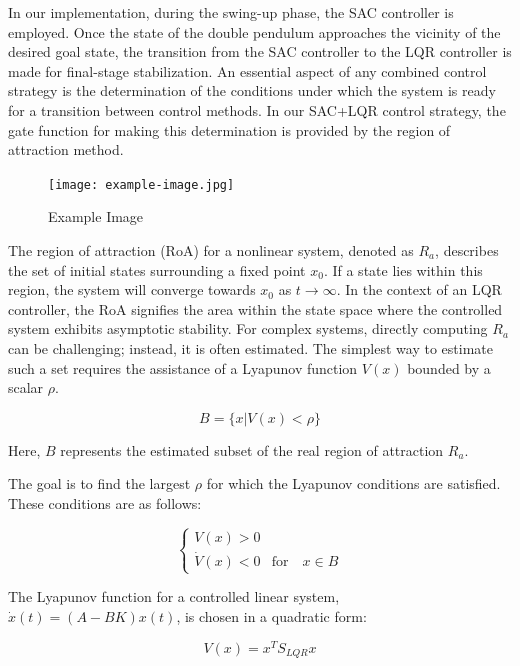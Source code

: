 In our implementation, during the swing-up phase, the SAC controller is employed. Once the state of the double pendulum approaches the vicinity of the desired goal state, the transition from the SAC controller to the LQR controller is made for final-stage stabilization. An essential aspect of any combined control strategy is the determination of the conditions under which the system is ready for a transition between control methods. In our SAC+LQR control strategy, the gate function for making this determination is provided by the region of attraction method\cite{maywald2022co}.

\begin{figure}[ht]
    \centering
    \texttt{[image: example-image.jpg]}
    \caption{Example Image}
    \label{fig:example}
\end{figure}


The region of attraction (RoA) for a nonlinear system, denoted as \(R_a\), describes the set of initial states surrounding a fixed point \(x_0\). If a state lies within this region, the system will converge towards \(x_0\) as \(t \rightarrow \infty\). In the context of an LQR controller, the RoA signifies the area within the state space where the controlled system exhibits asymptotic stability. For complex systems, directly computing \(R_a\) can be challenging; instead, it is often estimated. The simplest way to estimate such a set requires the assistance of a Lyapunov function \(V(x)\) bounded by a scalar \(\rho\)\cite{khalil2002nonlinear}.

\begin{equation}
 B = \{x|V(x)<\rho\}
\end{equation}

Here, \(B\) represents the estimated subset of the real region of attraction \(R_a\). 

The goal is to find the largest \(\rho\) for which the Lyapunov conditions are satisfied. These conditions are as follows:

\begin{equation}
\begin{cases}
   V(x) > 0 \\
   \dot{V}(x) < 0 & \text{for} \quad x \in B
\end{cases}
\label{eq:V_conditions}
\end{equation}

The Lyapunov function for a controlled linear system, \(\dot{x}(t) = (A - BK)x(t)\), is chosen in a quadratic form:

\begin{equation}
  V(x) = x^T S_{LQR} x 
  \label{eq:V}
\end{equation}

